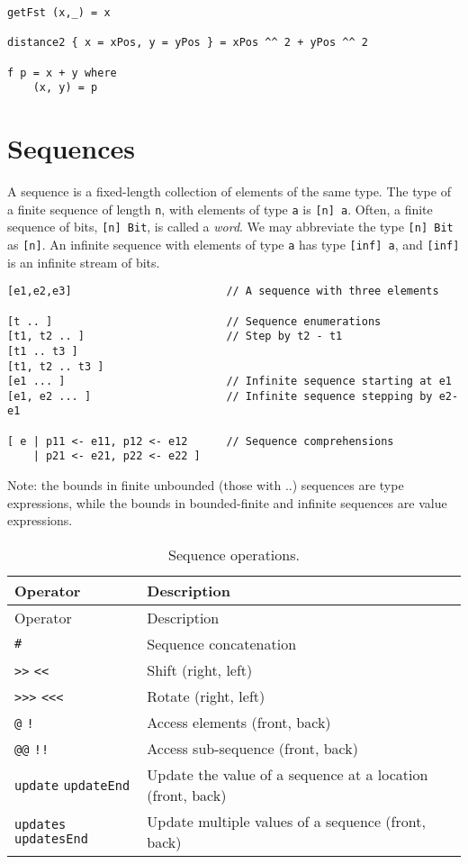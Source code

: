 \begin{verbatim}
getFst (x,_) = x

distance2 { x = xPos, y = yPos } = xPos ^^ 2 + yPos ^^ 2

f p = x + y where
    (x, y) = p
\end{verbatim}

\section{Sequences}\label{sequences}

A sequence is a fixed-length collection of elements of the same type.
The type of a finite sequence of length \texttt{n}, with elements of
type \texttt{a} is \texttt{{[}n{]}\ a}. Often, a finite sequence of
bits, \texttt{{[}n{]}\ Bit}, is called a \emph{word}. We may abbreviate
the type \texttt{{[}n{]}\ Bit} as \texttt{{[}n{]}}. An infinite sequence
with elements of type \texttt{a} has type \texttt{{[}inf{]}\ a}, and
\texttt{{[}inf{]}} is an infinite stream of bits.

\begin{verbatim}
[e1,e2,e3]                        // A sequence with three elements

[t .. ]                           // Sequence enumerations
[t1, t2 .. ]                      // Step by t2 - t1
[t1 .. t3 ]
[t1, t2 .. t3 ]
[e1 ... ]                         // Infinite sequence starting at e1
[e1, e2 ... ]                     // Infinite sequence stepping by e2-e1

[ e | p11 <- e11, p12 <- e12      // Sequence comprehensions
    | p21 <- e21, p22 <- e22 ]
\end{verbatim}

Note: the bounds in finite unbounded (those with ..) sequences are type
expressions, while the bounds in bounded-finite and infinite sequences
are value expressions.

\begin{longtable}[c]{@{}ll@{}}
\caption{Sequence operations.}\tabularnewline
\toprule
Operator & Description\tabularnewline
\midrule
\endfirsthead
\toprule
Operator & Description\tabularnewline
\midrule
\endhead
\texttt{\#} & Sequence concatenation\tabularnewline
\texttt{\textgreater{}\textgreater{}} \texttt{\textless{}\textless{}} &
Shift (right, left)\tabularnewline
\texttt{\textgreater{}\textgreater{}\textgreater{}}
\texttt{\textless{}\textless{}\textless{}} & Rotate
(right, left)\tabularnewline
\texttt{@} \texttt{!} & Access elements (front, back)\tabularnewline
\texttt{@@} \texttt{!!} & Access sub-sequence
(front, back)\tabularnewline
\texttt{update} \texttt{updateEnd} & Update the value of a sequence at a location (front, back)\tabularnewline
\texttt{updates} \texttt{updatesEnd} & Update multiple values of a sequence (front, back)\tabularnewline
\bottomrule
\end{longtable}

